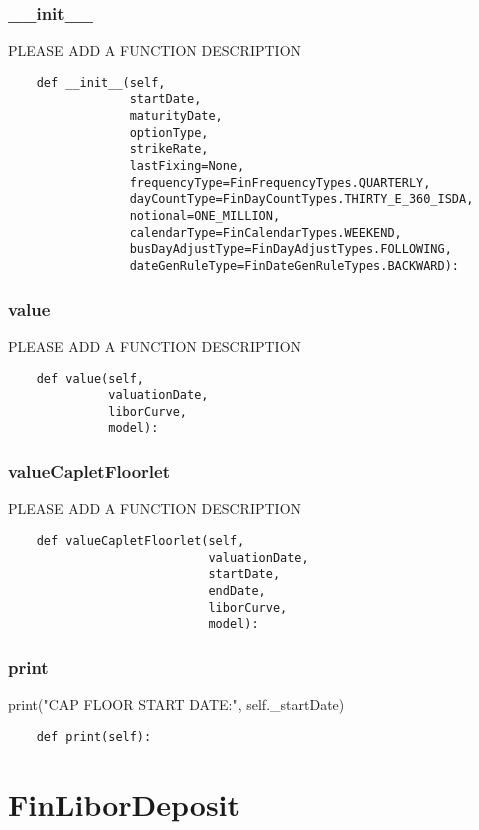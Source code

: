 \documentclass[twoside,11pt]{book}
\begin{document}
\subsubsection*{{\bf \_\_init\_\_}}
PLEASE ADD A FUNCTION DESCRIPTION

\begin{lstlisting}
    def __init__(self,
                 startDate,
                 maturityDate,
                 optionType,
                 strikeRate,
                 lastFixing=None,
                 frequencyType=FinFrequencyTypes.QUARTERLY,
                 dayCountType=FinDayCountTypes.THIRTY_E_360_ISDA,
                 notional=ONE_MILLION,
                 calendarType=FinCalendarTypes.WEEKEND,
                 busDayAdjustType=FinDayAdjustTypes.FOLLOWING,
                 dateGenRuleType=FinDateGenRuleTypes.BACKWARD):
\end{lstlisting}

\subsubsection*{{\bf value}}
PLEASE ADD A FUNCTION DESCRIPTION

\begin{lstlisting}
    def value(self,
              valuationDate,
              liborCurve,
              model):
\end{lstlisting}

\subsubsection*{{\bf valueCapletFloorlet}}
PLEASE ADD A FUNCTION DESCRIPTION

\begin{lstlisting}
    def valueCapletFloorlet(self,
                            valuationDate,
                            startDate,
                            endDate,
                            liborCurve,
                            model):
\end{lstlisting}

\subsubsection*{{\bf print}}
print("CAP FLOOR START DATE:", self.\_startDate) 

\begin{lstlisting}
    def print(self):
\end{lstlisting}

\newpage
\section{FinLiborDeposit}
\end{document}
